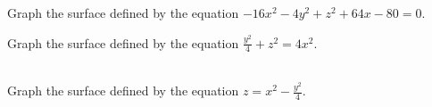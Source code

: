 \documentclass[mathNotesPreamble]{subfiles}
\begin{document}
    \begin{ex*}
      Graph the surface defined by the equation $-16x^2-4y^2+z^2+64x-80=0.$
    \end{ex*}
    \pagebreak

    \begin{ex*}
      Graph the surface defined by the equation $\displaystyle \frac{y^2}{4}+z^2=4x^2$.
    \end{ex*}
    \pagebreak

    \begin{ex*}\mbox{}\\
      Graph the surface defined by the equation $\displaystyle z=x^2-\frac{y^2}{4}$. 
    \end{ex*}
    \pagebreak

    
  
\end{document}
